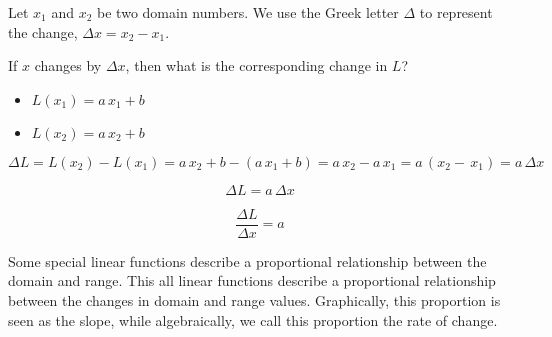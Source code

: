 \documentclass{ximera}
\begin{document}
Let $x_1$ and $x_2$ be two domain numbers.  We use the Greek letter $\Delta$ to represent the change, $\Delta x = x_2 - x_1$.


If $x$ changes by $\Delta x$, then what is the corresponding change in $L$?


\begin{itemize}
\item $L(x_1) = a \, x_1 + b$
\item $L(x_2) = a \, x_2 + b$
\end{itemize}


\[
\Delta L = L(x_2) - L(x_1) = a \, x_2 + b - (a \, x_1 + b) = a \, x_2  - a \, x_1  = a \, (x_2  -  \, x_1) = a \, \Delta x
\]



\[
\Delta L =  a \, \Delta x
\]


\[
\frac{\Delta L}{\Delta x} = a
\]




Some special linear functions describe a proportional relationship between the domain and range.  This all linear functions describe a proportional relationship between the changes in domain and range values. Graphically, this proportion is seen as the slope, while algebraically, we call this proportion the rate of change.
\end{document}

